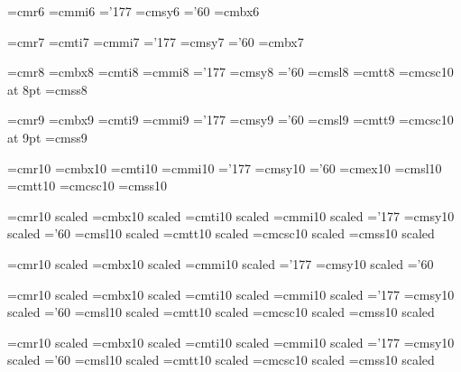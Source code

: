 \font\sixrm=cmr6
\font\sixi=cmmi6             \skewchar\sixi='177
\font\sixsy=cmsy6            \skewchar\sixsy='60
\font\sixbf=cmbx6

\font\sevenrm=cmr7
\font\sevenit=cmti7
\font\seveni=cmmi7             \skewchar\seveni='177
\font\sevensy=cmsy7            \skewchar\sevensy='60
\font\sevenbf=cmbx7

\font\eightrm=cmr8
\font\eightbf=cmbx8
\font\eightit=cmti8
\font\eighti=cmmi8			\skewchar\eighti='177
\font\eightsy=cmsy8			\skewchar\eightsy='60
\font\eightsl=cmsl8
\font\eighttt=cmtt8			\hyphenchar{}
\font\eightcsc=cmcsc10 at 8pt
\font\eightsf=cmss8

\font\ninerm=cmr9
\font\ninebf=cmbx9
\font\nineit=cmti9
\font\ninei=cmmi9			\skewchar\ninei='177
\font\ninesy=cmsy9			\skewchar\ninesy='60
\font\ninesl=cmsl9
\font\ninett=cmtt9			\hyphenchar{}
\font\ninecsc=cmcsc10 at 9pt
\font\ninesf=cmss9

\font\tenrm=cmr10
\font\tenbf=cmbx10
\font\tenit=cmti10
\font\teni=cmmi10		\skewchar\teni='177
\font\tensy=cmsy10		\skewchar\tensy='60
\font\tenex=cmex10
\font\tensl=cmsl10
\font\tentt=cmtt10		\hyphenchar{}
\font\tencsc=cmcsc10
\font\tensf=cmss10

\font\elevenrm=cmr10 scaled \magstephalf
\font\elevenbf=cmbx10 scaled \magstephalf
\font\elevenit=cmti10 scaled \magstephalf
\font\eleveni=cmmi10 scaled \magstephalf	\skewchar\eleveni='177
\font\elevensy=cmsy10 scaled \magstephalf	\skewchar\elevensy='60
\font\elevensl=cmsl10 scaled \magstephalf
\font\eleventt=cmtt10 scaled \magstephalf	\hyphenchar{}
\font\elevencsc=cmcsc10 scaled \magstephalf
\font\elevensf=cmss10 scaled \magstephalf

\font\twelverm=cmr10 scaled 
\font\twelvebf=cmbx10 scaled 
\font\twelvei=cmmi10 scaled       \skewchar\twelvei='177
\font\twelvesy=cmsy10 scaled      \skewchar\twelvesy='60

\font\fourteenrm=cmr10 scaled 
\font\fourteenbf=cmbx10 scaled 
\font\fourteenit=cmti10 scaled 
\font\fourteeni=cmmi10 scaled 		\skewchar\fourteeni='177
\font\fourteensy=cmsy10 scaled 	\skewchar\fourteensy='60
\font\fourteensl=cmsl10 scaled 
\font\fourteentt=cmtt10 scaled 	\hyphenchar{}
\font\fourteencsc=cmcsc10 scaled 
\font\fourteensf=cmss10 scaled 

\font\seventeenrm=cmr10 scaled 
\font\seventeenbf=cmbx10 scaled 
\font\seventeenit=cmti10 scaled 
\font\seventeeni=cmmi10 scaled 	\skewchar\seventeeni='177
\font\seventeensy=cmsy10 scaled 	\skewchar\seventeensy='60
\font\seventeensl=cmsl10 scaled 
\font\seventeentt=cmtt10 scaled 	\hyphenchar{}
\font\seventeencsc=cmcsc10 scaled 
\font\seventeensf=cmss10 scaled 
%
\fi

